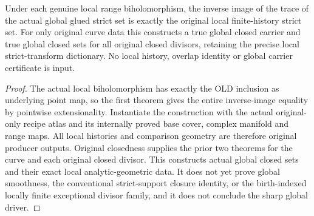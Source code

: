 \begin{theorem}
\label{hir:sharp-actual-glued-strict-set-local-biholomorphism-dictionary}
\leanok
Under each genuine local range biholomorphism, the inverse image of the
trace of the actual global glued strict set is exactly the original local
finite-history strict set. For only original curve data this constructs a
true global closed carrier and true global closed sets for all original
closed divisors, retaining the precise local strict-transform dictionary.
No local history, overlap identity or global carrier certificate is input.
\end{theorem}
\begin{proof}
The actual local biholomorphism has exactly the OLD inclusion as underlying
point map, so the first theorem gives the entire inverse-image equality by
pointwise extensionality. Instantiate the construction with the actual
original-only recipe atlas and its internally proved base cover, complex
manifold and range maps. All local histories and comparison geometry are
therefore original producer outputs. Original closedness supplies the prior
two theorems for the curve and each original closed divisor. This constructs
actual global closed sets and their exact local analytic-geometric data.
It does not yet prove global smoothness, the conventional strict-support
closure identity, or the birth-indexed locally finite exceptional divisor
family, and it does not conclude the sharp global driver.
\end{proof}
